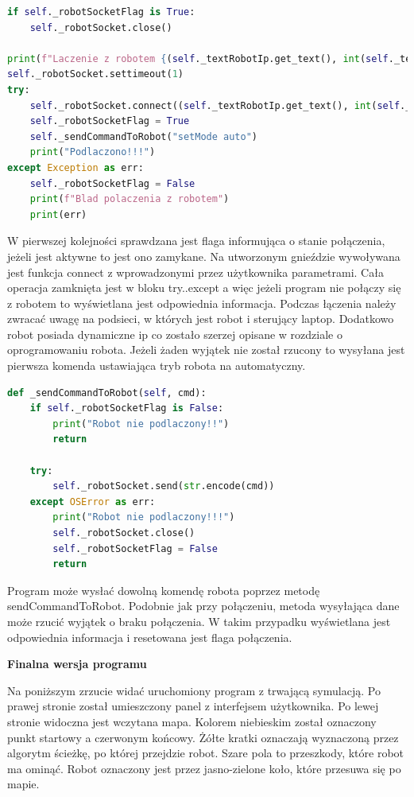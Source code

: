 \begin{lstlisting}[language=Python,caption=Nawiązanie połączenia,label={kodPythonGniazdo}]
if self._robotSocketFlag is True:
    self._robotSocket.close()

print(f"Laczenie z robotem {(self._textRobotIp.get_text(), int(self._textRobotPort.get_text()))}")
self._robotSocket.settimeout(1)
try:
    self._robotSocket.connect((self._textRobotIp.get_text(), int(self._textRobotPort.get_text())))
    self._robotSocketFlag = True
    self._sendCommandToRobot("setMode auto")
    print("Podlaczono!!!")
except Exception as err:
    self._robotSocketFlag = False
    print(f"Blad polaczenia z robotem")
    print(err)
\end{lstlisting}
W pierwszej kolejności sprawdzana jest flaga informująca o stanie połączenia, jeżeli jest aktywne to jest ono zamykane.
Na utworzonym gnieździe wywoływana jest funkcja connect z wprowadzonymi przez użytkownika parametrami.
Cała operacja zamknięta jest w bloku try..except a więc jeżeli program nie połączy się z robotem to wyświetlana jest odpowiednia informacja. 
Podczas łączenia należy zwracać uwagę na podsieci, w których jest robot i sterujący laptop. 
Dodatkowo robot posiada dynamiczne ip co zostało szerzej opisane w rozdziale o oprogramowaniu robota.
Jeżeli żaden wyjątek nie został rzucony to wysyłana jest pierwsza komenda ustawiająca tryb robota na automatyczny.


\begin{lstlisting}[language=Python,caption=Wysyłanie komendy do robota,label={kodPythonSendCmd}]
def _sendCommandToRobot(self, cmd):
    if self._robotSocketFlag is False:
        print("Robot nie podlaczony!!")
        return
    
    try:
        self._robotSocket.send(str.encode(cmd))
    except OSError as err:
        print("Robot nie podlaczony!!!")
        self._robotSocket.close()
        self._robotSocketFlag = False
        return
\end{lstlisting}
Program może wysłać dowolną komendę robota poprzez metodę sendCommandToRobot. 
Podobnie jak przy połączeniu, metoda wysyłająca dane może rzucić wyjątek o braku połączenia. W takim przypadku
wyświetlana jest odpowiednia informacja i resetowana jest flaga połączenia. 



\textbf{Finalna wersja programu}

Na poniższym zrzucie widać uruchomiony program z trwającą symulacją. Po prawej stronie został umieszczony panel 
z interfejsem użytkownika. Po lewej stronie widoczna jest wczytana mapa. 
Kolorem niebieskim został oznaczony punkt startowy a czerwonym końcowy.
Żółte kratki oznaczają wyznaczoną przez algorytm ścieżkę, po której przejdzie robot. Szare pola to przeszkody, które robot ma ominąć. 
Robot oznaczony jest przez jasno-zielone koło, które przesuwa się po mapie. 

